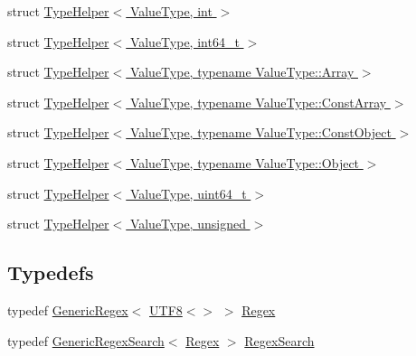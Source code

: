 \begin{DoxyCompactItemize}
\item 
struct \hyperlink{structinternal_1_1TypeHelper_3_01ValueType_00_01int_01_4}{Type\+Helper$<$ Value\+Type, int $>$}
\item 
struct \hyperlink{structinternal_1_1TypeHelper_3_01ValueType_00_01int64__t_01_4}{Type\+Helper$<$ Value\+Type, int64\+\_\+t $>$}
\item 
struct \hyperlink{structinternal_1_1TypeHelper_3_01ValueType_00_01typename_01ValueType_1_1Array_01_4}{Type\+Helper$<$ Value\+Type, typename Value\+Type\+::\+Array $>$}
\item 
struct \hyperlink{structinternal_1_1TypeHelper_3_01ValueType_00_01typename_01ValueType_1_1ConstArray_01_4}{Type\+Helper$<$ Value\+Type, typename Value\+Type\+::\+Const\+Array $>$}
\item 
struct \hyperlink{structinternal_1_1TypeHelper_3_01ValueType_00_01typename_01ValueType_1_1ConstObject_01_4}{Type\+Helper$<$ Value\+Type, typename Value\+Type\+::\+Const\+Object $>$}
\item 
struct \hyperlink{structinternal_1_1TypeHelper_3_01ValueType_00_01typename_01ValueType_1_1Object_01_4}{Type\+Helper$<$ Value\+Type, typename Value\+Type\+::\+Object $>$}
\item 
struct \hyperlink{structinternal_1_1TypeHelper_3_01ValueType_00_01uint64__t_01_4}{Type\+Helper$<$ Value\+Type, uint64\+\_\+t $>$}
\item 
struct \hyperlink{structinternal_1_1TypeHelper_3_01ValueType_00_01unsigned_01_4}{Type\+Helper$<$ Value\+Type, unsigned $>$}
\end{DoxyCompactItemize}
\subsection*{Typedefs}
\begin{DoxyCompactItemize}
\item 
typedef \hyperlink{classinternal_1_1GenericRegex}{Generic\+Regex}$<$ \hyperlink{structUTF8}{U\+T\+F8}$<$$>$ $>$ \hyperlink{namespaceinternal_ae7fc20c6ee680ae3ba16ae16b4bd5e16}{Regex}
\item 
typedef \hyperlink{classinternal_1_1GenericRegexSearch}{Generic\+Regex\+Search}$<$ \hyperlink{namespaceinternal_ae7fc20c6ee680ae3ba16ae16b4bd5e16}{Regex} $>$ \hyperlink{namespaceinternal_a7101e324c2d06f1505ef7c7d4401392b}{Regex\+Search}
\end{DoxyCompactItemize}
